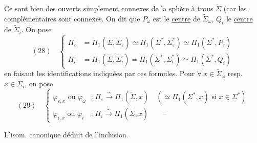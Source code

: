 Ce sont bien des ouverts  simplement connexes de la sphère à trous $\widetilde\Sigma$ (car les complémentaires  sont connexes. On dit que $P_\omega$ est le \uline{centre} de $\widetilde\Sigma_\omega$, $Q_i$ le \uline{centre} de $\widetilde\Sigma_i$.
On pose
\[
(28)\quad\left\{\begin{aligned}
\Pi_\varepsilon&=\Pi_1(\widetilde\Sigma,\widetilde\Sigma_\varepsilon)\simeq\Pi_1(\Sigma^*,\Sigma_\varepsilon^*)\simeq\Pi_1(\Sigma^*,P_\varepsilon)\\
\Pi_i&=\Pi_1(\widetilde\Sigma,\widetilde\Sigma_i)=\Pi_1(\Sigma^*,\Sigma_i^*)\simeq\Pi_1(\Sigma^*,Q_i)
\end{aligned}\right.
\]
en faisant les identifications indiquées par ces formules.  Pour $\forall\ x\in\widetilde\Sigma_\omega$ resp. $x\in\widetilde\Sigma_i$, on pose
\[
(29)\quad\left\{\begin{aligned}
\varphi_{\varepsilon,x}\text{ ou }\varphi_\omega&:\Pi_\varepsilon\xrightarrow{\sim}\Pi_1(\widetilde\Sigma,x)\quad(\simeq\Pi_1(\Sigma^*,x)\text{ si }x\in\Sigma^*)\\
\varphi_{i,x}\text{ ou }\varphi_i&:\Pi_i\xrightarrow{\sim}\Pi_1(\widetilde\Sigma,x)\qquad\text{--}
\end{aligned}\right.
\]

L'isom. canonique déduit de l'inclusion.

